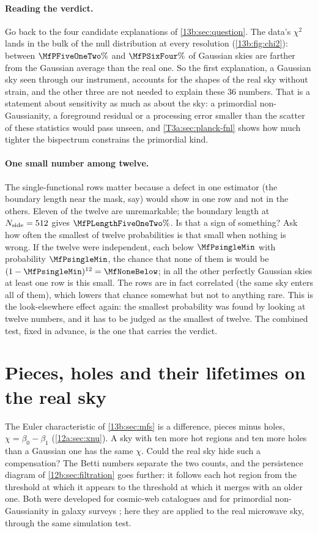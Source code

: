 \paragraph{Reading the verdict.} Go back to the four candidate explanations of \cref{13b:sec:question}. The data's
$\chi^2$ lands in the bulk of the null distribution at every resolution (\cref{13b:fig:chi2}): between
$\MfPFiveOneTwo\%$ and $\MfPSixFour\%$ of Gaussian skies are farther from the Gaussian average than the real one.
So the first explanation, a Gaussian sky seen through our instrument, accounts for the shapes of the real sky
without strain, and the other three are not needed to explain these $36$ numbers. That is a statement about
sensitivity as much as about the sky: a primordial non-Gaussianity, a foreground residual or a processing error
smaller than the scatter of these statistics would pass unseen, and \cref{T3a:sec:planck-fnl} shows how much
tighter the bispectrum constrains the primordial kind.

\paragraph{One small number among twelve.} The single-functional rows matter because a defect in one estimator
(the boundary length near the mask, say) would show in one row and not in the others. Eleven of the twelve are
unremarkable; the boundary length at $N_{\rm side}=512$ gives $\MfPLengthFiveOneTwo\%$. Is that a sign of
something? Ask how often the smallest of twelve probabilities is that small when nothing is wrong. If the twelve were
independent, each below $\MfPsingleMin$ with probability $\MfPsingleMin$, the chance that none of them is would be
$(1-\MfPsingleMin)^{12}=\MfNoneBelow$; in all the other perfectly Gaussian skies at least one row is this small. The rows are
in fact correlated (the same sky enters all of them), which lowers that chance somewhat but not to anything rare.
This is the look-elsewhere effect again: the smallest probability was found by looking at twelve numbers, and it has to be judged as
the smallest of twelve. The combined test, fixed in advance, is the one that carries the verdict.
\section{Pieces, holes and their lifetimes on the real sky}
\label{13b:sec:betti}

The Euler characteristic of \cref{13b:sec:mfs} is a difference, pieces minus holes, $\chi=\beta_0-\beta_1$
(\cref{12a:sec:xnu}). A sky with ten more hot regions and ten more holes than a Gaussian one has the same $\chi$.
Could the real sky hide such a compensation? The Betti numbers separate the two counts, and the persistence
diagram of \cref{12b:sec:filtration} goes further: it follows each hot region from the threshold at which it
appears to the threshold at which it merges with an older one. Both were developed for cosmic-web catalogues
\cite{Pranav2017} and for primordial non-Gaussianity in galaxy surveys \cite{Biagetti2021}; here they are applied to
the real microwave sky, through the same simulation test.

